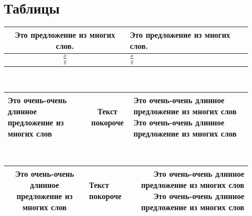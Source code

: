\section{Таблицы}

\setlength{\extrarowheight}{5mm}
\begin{tabular}{|cp{4cm}|} %
    \hline
    Это предложение из многих слов. &
    Это предложение из многих слов.
    \\
    \hline
    $\displaystyle \frac{x}{y}$     &
    $\displaystyle \frac{x}{y}$
    \\[5mm] %
    \hline
\end{tabular}
\setlength{\extrarowheight}{0mm}
\\

\begin{tabularx}{\textwidth}{|X|c|X|}
    \hline
    Это очень-очень длинное предложение из многих слов &
    Текст покороче                                     &
    Это очень-очень длинное предложение из многих слов Это очень-очень длинное предложение из многих слов
    \\ \hline
\end{tabularx}
\\

\begin{tabulary}{\textwidth}{|C|J|R|}
    \hline
    Это очень-очень длинное предложение из многих слов &
    Текст покороче &
    Это очень-очень длинное предложение из многих слов Это очень-очень длинное предложение из многих слов
    \\ \hline
\end{tabulary}


